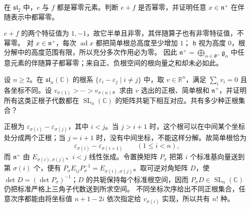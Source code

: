 \begin{exercise}\label{b5:ex:16-nilpotent-sum}
	在 \(\mathfrak{sl}_2\) 中，\(e\) 与 \(f\) 都是幂零元素。判断 \(e+f\) 是否幂零，并证明任意 \(x\in\mathfrak n^+\) 在伴随表示中都幂零。
\end{exercise}
\begin{solution}
	\(e+f\) 的两个特征值为 \(1,-1\)，故它半单且非零，其伴随算子也有非零特征值，不幂零。 对 \(x\in\mathfrak n^+\)，每次 \(\operatorname{ad}x\) 都把简单根总高度至少增加 \(1\)； \(\mathfrak h\) 视为高度 \(0\)，根分解中的高度范围有限，所以充分多次作用必为零。 因此 \(\mathfrak n^+=\bigoplus_{\alpha\in\Phi^+}\mathfrak g_\alpha\) 中任意元素的伴随算子都幂零；来自正、负根空间的根向量之和却未必如此。
\end{solution}

\begin{exercise}\label{b5:ex:16-positive-systems}
	设 \(n\ge2\)。在 \(\mathfrak{sl}_n(\mathbb C)\) 的根系 \(\{\varepsilon_i-\varepsilon_j\mid i\ne j\}\) 中，取 \(v\in\mathbb R^n\)，满足 \(\sum_i v_i=0\) 且各坐标不同。设 \(v_{\sigma(1)}>\cdots>v_{\sigma(n)}\)。求由 \(v\) 选出的正根、简单根和 \(\mathfrak n^+\)，并证明所有这类正根子代数都在 \(\operatorname{SL}_n(\mathbb C)\) 的矩阵共轭下相互对应。共有多少种正根集合？
\end{exercise}
\begin{solution}
	正根为 \(\varepsilon_{\sigma(i)}-\varepsilon_{\sigma(j)}\)，其中 \(i<j\)。当 \(j>i+1\) 时，这个根可以在中间某个坐标处分成两个正根；当 \(j=i+1\) 时，没有中间坐标，不能这样分解。故简单根恰为
	\[
		\varepsilon_{\sigma(i)}-\varepsilon_{\sigma(i+1)} \qquad(1\le i<n),
	\]
	而 \(\mathfrak n^+\) 由 \(E_{\sigma(i),\sigma(j)}\)、\(i<j\) 线性张成。令置换矩阵 \(P_\sigma\) 把第 \(i\) 个标准基向量送到第 \(\sigma(i)\) 个，便有 \(P_\sigma E_{ij}P_\sigma^{-1}=E_{\sigma(i),\sigma(j)}\)。取可逆对角矩阵 \(D\)，使 \(\det D=(\det P_\sigma)^{-1}\)；\(D\) 的共轭保持每个标准根空间，因而 \(P_\sigma D\in\operatorname{SL}_n(\mathbb C)\) 仍把标准严格上三角子代数送到所求空间。 不同坐标次序给出不同正根集合，任意次序都能由将坐标值 \(n+1-2i\) 依次指定给 \(v_{\sigma(i)}\) 实现，所以共有 \(n!\) 种。
\end{solution}

